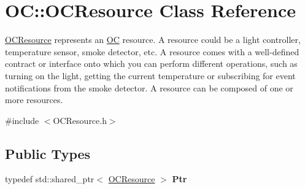 \hypertarget{classOC_1_1OCResource}{}\section{O\+C\+:\+:O\+C\+Resource Class Reference}
\label{classOC_1_1OCResource}


\hyperlink{classOC_1_1OCResource}{O\+C\+Resource} represents an \hyperlink{namespaceOC}{O\+C} resource. A resource could be a light controller, temperature sensor, smoke detector, etc. A resource comes with a well-\/defined contract or interface onto which you can perform different operations, such as turning on the light, getting the current temperature or subscribing for event notifications from the smoke detector. A resource can be composed of one or more resources.  




{\ttfamily \#include $<$O\+C\+Resource.\+h$>$}

\subsection*{Public Types}
\begin{DoxyCompactItemize}
\item 
\hypertarget{classOC_1_1OCResource_ab53adb7ab10b8fa21f4dffb4e714e92b}{}typedef std\+::shared\+\_\+ptr$<$ \hyperlink{classOC_1_1OCResource}{O\+C\+Resource} $>$ {\bfseries Ptr}\label{classOC_1_1OCResource_ab53adb7ab10b8fa21f4dffb4e714e92b}

\end{DoxyCompactItemize}
